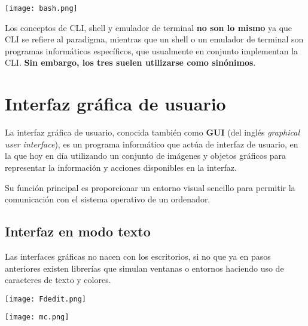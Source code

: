 \begin{center}
    \texttt{[image: bash.png]}
\end{center}

Los conceptos de CLI, shell y emulador de terminal \textbf{no son lo mismo} ya que CLI se refiere al paradigma, mientras que un shell o un emulador de terminal son programas informáticos específicos, que usualmente en conjunto implementan la CLI. \textbf{Sin embargo, los tres suelen utilizarse como sinónimos}.


\section{Interfaz gráfica de usuario}

La interfaz gráfica de usuario, conocida también como \textbf{GUI} (del inglés \textit{graphical user interface}), es un programa informático que actúa de interfaz de usuario, en la que hoy en día utilizando un conjunto de imágenes y objetos gráficos para representar la información y acciones disponibles en la interfaz.

Su función principal es proporcionar un entorno visual sencillo para permitir la comunicación con el sistema operativo de un ordenador.

\subsection{Interfaz en modo texto}

Las interfaces gráficas no nacen con los escritorios, si no que ya en pasos anteriores existen librerías que simulan ventanas o entornos haciendo uso de caracteres de texto y colores.

{
    \begin{minipage}{0.49\linewidth}
        \texttt{[image: Fdedit.png]}
    \end{minipage}
    \hfill
    \begin{minipage}{0.49\linewidth}
        \texttt{[image: mc.png]}
    \end{minipage}
}


